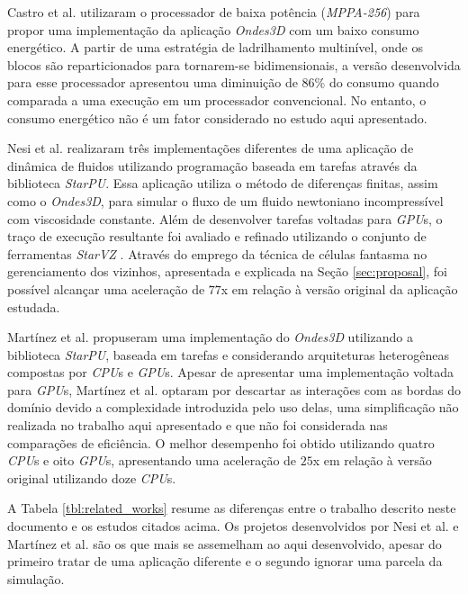 \documentclass[cic,tc]{iiufrgs}
\begin{document}
Castro et al. \cite{CASTRO2016108} utilizaram o processador de baixa potência (\textit{MPPA-256}) para propor uma implementação da aplicação \textit{Ondes3D} com um baixo consumo energético. A partir
de uma estratégia de ladrilhamento multinível, onde os blocos são reparticionados para tornarem-se bidimensionais, a versão desenvolvida para esse processador apresentou uma diminuição de $86\%$ do consumo quando comparada a uma
execução em um processador convencional. No entanto, o consumo energético não é um fator considerado no estudo aqui apresentado.



Nesi et al. \cite{nesi} realizaram três implementações diferentes de uma aplicação de dinâmica de fluidos utilizando programação baseada em tarefas através da biblioteca \textit{StarPU}. Essa aplicação utiliza o método de diferenças finitas, assim como o \textit{Ondes3D}, para simular o fluxo de um fluido newtoniano incompressível com viscosidade constante. Além de desenvolver tarefas voltadas para \textit{GPU}s, o traço de execução resultante foi avaliado e refinado utilizando o conjunto de ferramentas \textit{StarVZ} \cite{starvz1, starvz2, starvz3}. Através do emprego da técnica de células fantasma no gerenciamento dos vizinhos, apresentada e explicada na Seção \ref{sec:proposal}, foi possível alcançar uma aceleração de $77$x em relação à versão original da aplicação estudada.

Martínez et al. \cite{victor} propuseram uma implementação do \textit{Ondes3D} utilizando a biblioteca \textit{StarPU}, baseada em tarefas e considerando arquiteturas heterogêneas compostas por
\textit{CPU}s e \textit{GPU}s. Apesar de apresentar uma implementação voltada para \textit{GPU}s, Martínez et al.
optaram por descartar as interações com as bordas do domínio devido a complexidade introduzida pelo uso delas, uma simplificação não realizada no trabalho aqui apresentado e que não foi considerada nas comparações de eficiência. O melhor desempenho foi obtido utilizando quatro \textit{CPU}s e oito
\textit{GPU}s, apresentando uma aceleração de $25$x em relação à versão original utilizando doze \textit{CPU}s.

A Tabela \ref{tbl:related_works} resume as diferenças entre o trabalho descrito neste documento e os estudos citados acima. Os projetos desenvolvidos por Nesi et al. e Martínez et al. são
os que mais se assemelham ao aqui desenvolvido, apesar do primeiro tratar de uma aplicação diferente e o segundo ignorar uma parcela da simulação.
\end{document}
